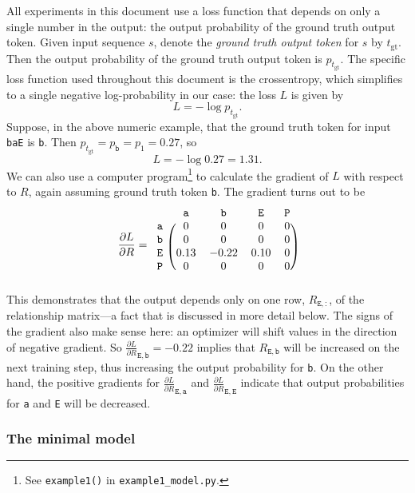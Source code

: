 \documentclass{article}
\newcommand{\ta}{\mathtt{a}}
\newcommand{\tb}{\mathtt{b}}
\newcommand{\tE}{\mathtt{E}}
\newcommand{\tP}{\mathtt{P}}
\newcommand{\dLdR}{\frac{\partial L}{\partial R}}
\begin{document}
All experiments in this document use a loss function that depends on
only a single number in the output: the output probability of the
ground truth output token. Given input sequence $s$, denote the
\emph{ground truth output token} for $s$ by $t_\text{gt}$. Then the
output probability of the ground truth output token is
$p_{t_\text{gt}}$.  The specific loss function used throughout this
document is the crossentropy, which simplifies to a single negative
log-probability in our case: the loss $L$ is given by
\begin{displaymath}
  L = -\log p_{t_\text{gt}}.
\end{displaymath}
Suppose, in the above numeric example, that the ground truth token for
input \texttt{baE} is \texttt{b}. Then $p_{t_\text{gt}} = p_\tb = p_1 = 0.27$, so
\begin{displaymath}
  L = -\log 0.27 = 1.31.
\end{displaymath}
We can also use a computer program\footnote{See \texttt{example1()} in
  \texttt{example1\_model.py}.} to calculate the gradient of $L$ with
respect to $R$, again assuming ground truth token \texttt{b}. The
gradient turns out to be
\begin{displaymath}
  \dLdR =
      \begin{blockarray}{ccccc}
       & \ta & \tb & \tE & \tP  \\
      \begin{block}{c(cccc)}
        \ta & 0 & 0 & 0 & 0 \\
        \tb & 0 & 0 & 0 & 0 \\
        \tE & 0.13 & -0.22 & 0.10 & 0 \\
        \tP & 0 & 0 & 0 & 0 \\
      \end{block}
    \end{blockarray}
\end{displaymath}
This demonstrates that the output depends only on one row,
$R_{\tE,:}$, of the relationship matrix---a fact that is discussed in
more detail below. The signs of the gradient also make sense here: an
optimizer will shift values in the direction of negative gradient. So
$\dLdR_{\tE,\tb}=-0.22$ implies that $R_{\tE,\tb}$ will be increased
on the next training step, thus increasing the output probability for
\texttt{b}. On the other hand, the positive gradients for
$\dLdR_{\tE,\ta}$ and $\dLdR_{\tE,\tE}$ indicate that output
probabilities for \texttt{a} and \texttt{E} will be decreased.


\subsubsection*{The minimal model}
\end{document}
